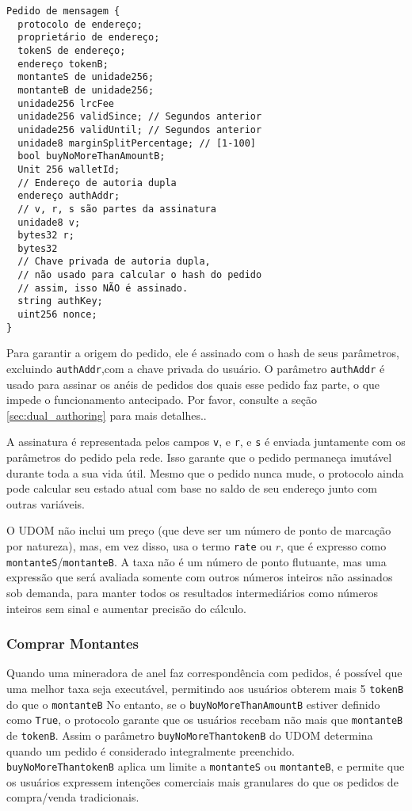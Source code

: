 \documentclass[UTF8,nofonts]{article}
\begin{document}
\begin{multicols}{2}
\begin{verbatim}
Pedido de mensagem {
  protocolo de endereço;
  proprietário de endereço;
  tokenS de endereço;
  endereço tokenB;
  montanteS de unidade256;
  montanteB de unidade256;
  unidade256 lrcFee
  unidade256 validSince; // Segundos anterior
  unidade256 validUntil; // Segundos anterior
  unidade8 marginSplitPercentage; // [1-100]
  bool buyNoMoreThanAmountB;
  Unit 256 walletId;
  // Endereço de autoria dupla
  endereço authAddr;
  // v, r, s são partes da assinatura
  unidade8 v;
  bytes32 r;
  bytes32
  // Chave privada de autoria dupla,
  // não usado para calcular o hash do pedido
  // assim, isso NÃO é assinado.
  string authKey;
  uint256 nonce;
}
\end{verbatim}


Para garantir a origem do pedido, ele é assinado com o hash de seus parâmetros, excluindo \verb|authAddr|,com a chave privada do usuário. O parâmetro \verb|authAddr| é usado para assinar os anéis de pedidos dos quais esse pedido faz parte, o que impede o funcionamento antecipado. Por favor, consulte a seção \ref{sec:dual_authoring} para mais detalhes..

A assinatura é representada pelos campos \verb|v|, e \verb|r|, e \verb|s| é enviada juntamente com os parâmetros do pedido pela rede. Isso garante que o pedido permaneça imutável durante toda a sua vida útil. Mesmo que o pedido nunca mude, o protocolo ainda pode calcular seu estado atual com base no saldo de seu endereço junto com outras variáveis.



O UDOM não inclui um preço (que deve ser um número de ponto de marcação por natureza), mas, em vez disso, usa o termo \verb|rate| ou $r$, que é expresso como \verb|montanteS|/\verb|montanteB|.  A taxa não é um número de ponto flutuante, mas uma expressão que será avaliada somente com outros números inteiros não assinados sob demanda, para manter todos os resultados intermediários como números inteiros sem sinal e aumentar precisão do cálculo.


\subsubsection{Comprar Montantes}

Quando uma mineradora de anel faz correspondência com pedidos, é possível que uma melhor taxa seja executável, permitindo aos usuários obterem mais 5 \verb|tokenB| do que o \verb|montanteB| No entanto, se o \verb|buyNoMoreThanAmountB| estiver definido como \verb|True|,  o protocolo garante que os usuários recebam não mais que \verb|montanteB| de \verb|tokenB|. Assim o parâmetro \verb|buyNoMoreThantokenB| do UDOM determina quando um pedido é considerado integralmente preenchido. \verb|buyNoMoreThantokenB| aplica um limite a  \verb|montanteS| ou \verb|montanteB|, e permite que os usuários expressem intenções comerciais mais granulares do que os pedidos de compra/venda tradicionais.



\end{multicols}
\end{document}
